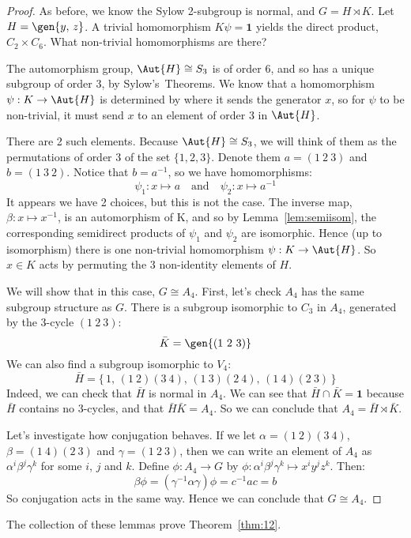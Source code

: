 \begin{proof}
    As before, we know the Sylow 2-subgroup is normal, and \(G = H \rtimes K\).
    Let \(H = \gen{y,\,z}\).
    A trivial homomorphism \(K\psi = \bm{1}\) yields the direct product, \(C_2 \times C_6\).
    What non-trivial homomorphisms are there?

    The automorphism group, \(\Aut{H} \cong S_3\) is of order 6, and so has a unique subgroup of order 3, by
    Sylow's~Theorems.
    We know that a homomorphism \(\psi: K \to \Aut{H}\) is determined by where it sends the generator
    \(x\), so for \(\psi\) to be non-trivial, it must send \(x\) to an element of order 3 in \(\Aut{H}\).

    There are 2 such elements.
    Because \(\Aut{H} \cong S_3\), we will think of them as the permutations of order 3 of the set \(\{1, 2, 3\}\).
    Denote them \(a = (1\ 2\ 3)\) and \(b = (1\ 3\ 2)\).
    Notice that \(b = a^{-1}\), so we have homomorphisms:
    \[\psi_1:x \mapsto a \quad \text{and} \quad \psi_2:x \mapsto a^{-1}\]
    It appears we have 2 choices, but this is not the case.
    The inverse map, \(\beta:x \mapsto x^{-1}\), is an automorphism of K, and so by Lemma~\ref{lem:semiisom}, the
    corresponding semidirect products of \(\psi_1\) and \(\psi_2\) are isomorphic.
    Hence (up to isomorphism) there is one non-trivial homomorphism \(\psi:K \to \Aut{H}\).
    So \(x \in K\) acts by permuting the 3 non-identity elements of \(H\).

    We will show that in this case, \(G \cong A_4\).
    First, let's check \(A_4\) has the same subgroup structure as \(G\).
    There is a subgroup isomorphic to \(C_3\) in \(A_4\), generated by the 3-cycle \((1\ 2\ 3)\):
    \[\bar{K} = \gen{(1\ 2\ 3)}\]
    We can also find a subgroup isomorphic to \(V_4\):
    \[\bar{H} = \{\,1,\, (1\ 2)(3\ 4),\, (1\ 3)(2\ 4),\, (1\ 4)(2\ 3)\,\}\]
    Indeed, we can check that \(\bar{H}\) is normal in \(A_4\).
    We can see that \(\bar{H} \cap \bar{K} = \bm{1}\) because \(\bar{H}\) contains no 3-cycles, and that
    \(\bar{H}\bar{K} = A_4\).
    So we can conclude that \(A_4 = \bar{H} \rtimes \bar{K}\).

    Let's investigate how conjugation behaves.
    If we let \(\alpha = (1\ 2)(3\ 4)\), \(\beta = (1\ 4)(2\ 3)\) and \(\gamma = (1\ 2\ 3)\), then we can write an
    element of \(A_4\) as \(\alpha^i\beta^j\gamma^k\) for some \(i\), \(j\) and \(k\).
    Define \(\phi:A_4 \to G\) by \(\phi:\alpha^i\beta^j\gamma^k \mapsto x^{i}y^{j}z^{k}\).
    Then:
    \[\beta\phi = (\gamma^{-1}\alpha\gamma)\phi = c^{-1}ac = b\]
    So conjugation acts in the same way.
    Hence we can conclude that \(G \cong A_4\).
\end{proof}

The collection of these lemmas prove Theorem~\ref{thm:12}.

